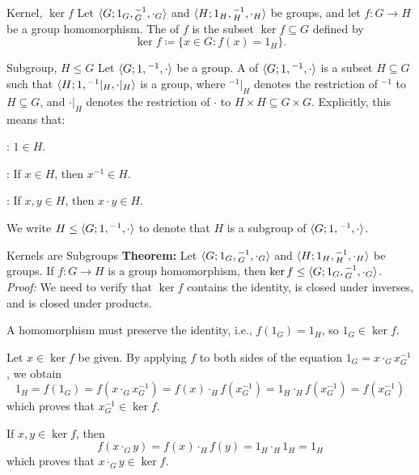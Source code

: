 \documentclass[12pt]{report}
\begin{document}
\begin{dfnbox}{Kernel, $\ker f$}
	Let ${\langle {G; 1_G, {}^{-1}_G, \cdot_G} \rangle}$ and ${\langle {H; 1_H, {}^{-1}_H, \cdot_H} \rangle}$ be groups, and let $f: G \to H$ be a group homomorphism. The  of $f$ is the subset $\ker f \subseteq G$ defined by
	\[ \ker f \coloneq \{ x \in G : f(x) = 1_H \}. \]
\end{dfnbox}

\begin{dfnbox}{Subgroup, $H \le G$}
	Let ${\langle {G; 1, {}^{-1}, \cdot} \rangle}$ be a group. A  of ${\langle {G; 1, {}^{-1}, \cdot} \rangle}$ is a subset $H \subseteq G$ such that ${\langle {H; 1, {}^{-1}|_H, \cdot|_H} \rangle}$ is a group, where ${}^{-1}|_H$ denotes the restriction of ${}^{-1}$ to $H \subseteq G$, and $\cdot|_H$ denotes the restriction of $\cdot$ to $H \times H \subseteq G \times G$. Explicitly, this means that:
	\begin{dfnitems}
		\item {}: $1 \in H$.
		\item {}: If $x \in H$, then $x^{-1} \in H$.
		\item {}: If $x, y \in H$, then $x \cdot y \in H$.
	\end{dfnitems}
	We write $H \le {\langle {G; 1, {}^{-1}, \cdot} \rangle}$ to denote that $H$ is a subgroup of ${\langle {G; 1, {}^{-1}, \cdot} \rangle}$.
\end{dfnbox}

\begin{thmbox}{Kernels are Subgroups}
	\textbf{Theorem:} Let ${\langle {G; 1_G, {}^{-1}_G, \cdot_G} \rangle}$ and ${\langle {H; 1_H, {}^{-1}_H, \cdot_H} \rangle}$ be groups. If $f: G \to H$ is a group homomorphism, then $\ker f \le {\langle {G; 1_G, {}^{-1}_G, \cdot_G} \rangle}$.
\tcblower
	\textit{Proof:} We need to verify that $\ker f$ contains the identity, is closed under inverses, and is closed under products.
	\begin{dfnitems}
		\item A homomorphism must preserve the identity, i.e., $f(1_G) = 1_H$, so $1_G \in \ker f$.
		\item Let $x \in \ker f$ be given. By applying $f$ to both sides of the equation $1_G = x \cdot_G x^{-1}_G$, we obtain
		\[ 1_H = f(1_G) = f(x \cdot_G x^{-1}_G) = f(x) \cdot_H f(x^{-1}_G) = 1_H \cdot_H f(x^{-1}_G) = f(x^{-1}_G) \]
		which proves that $x^{-1}_G \in \ker f$.
		\item If $x, y \in \ker f$, then
		\[ f(x \cdot_G y) = f(x) \cdot_H f(y) = 1_H \cdot_H 1_H = 1_H \]
		which proves that $x \cdot_G y \in \ker f$.
	\end{dfnitems}
\end{thmbox}
\end{document}
